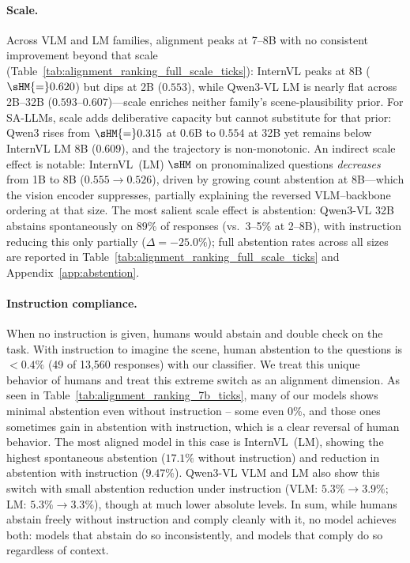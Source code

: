 \paragraph{Scale.}
Across VLM and LM families, alignment peaks at 7--8B with no consistent improvement beyond that scale (Table~\ref{tab:alignment_ranking_full_scale_ticks}): InternVL peaks at 8B ($\sHM{=}0.620$) but dips at 2B ($0.553$), while Qwen3-VL LM is nearly flat across 2B--32B ($0.593$--$0.607$)---scale enriches neither family's scene-plausibility prior.
For SA-LLMs, scale adds deliberative capacity but cannot substitute for that prior: Qwen3 rises from $\sHM{=}0.315$ at 0.6B to $0.554$ at 32B yet remains below InternVL LM 8B ($0.609$), and the trajectory is non-monotonic.
An indirect scale effect is notable: InternVL~(LM) $\sHM$ on pronominalized questions \emph{decreases} from 1B to 8B ($0.555{\to}0.526$), driven by growing count abstention at 8B---which the vision encoder suppresses, partially explaining the reversed VLM--backbone ordering at that size.
The most salient scale effect is abstention: Qwen3-VL 32B abstains spontaneously on 89\% of responses (vs.\ 3--5\% at 2--8B), with instruction reducing this only partially ($\Delta{=}{-}25.0\%$); full abstention rates across all sizes are reported in Table~\ref{tab:alignment_ranking_full_scale_ticks} and Appendix~\ref{app:abstention}.

\paragraph{Instruction compliance.}
When no instruction is given, humans would abstain and double check on the task. 
With instruction to imagine the scene, human abstention to the questions is $<\!0.4\%$ (49 of 13,560 responses) with our classifier. We treat this unique behavior of humans and treat this extreme switch as an alignment dimension. 
As seen in Table~\ref{tab:alignment_ranking_7b_ticks}, many of our models shows minimal abstention even without instruction -- some even 0\%, and those ones sometimes gain in abstention with instruction, which is a clear reversal of human behavior. 
The most aligned model in this case is InternVL~(LM), showing the highest spontaneous abstention ($17.1\%$ without instruction) and reduction in abstention with instruction ($9.47\%$). Qwen3-VL VLM and LM also show this switch with small abstention reduction under instruction (VLM: $5.3\%{\to}3.9\%$; LM: $5.3\%{\to}3.3\%$), though at much lower absolute levels.
In sum, while humans abstain freely without instruction and comply cleanly with it, no model achieves both: models that abstain do so inconsistently, and models that comply do so regardless of context.
